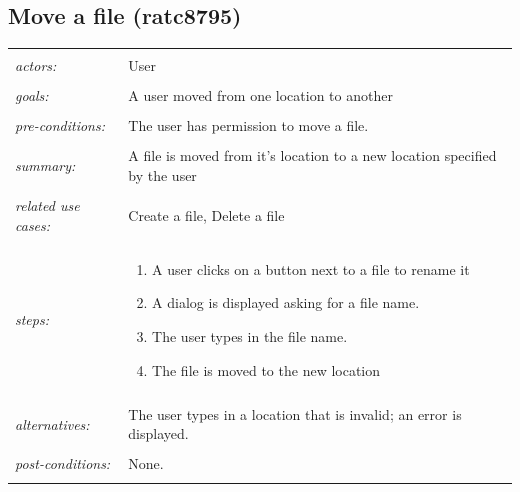 \documentclass[11pt]{report}
\begin{document}
\begin{IDE-like Features}
\begin{}
\begin{Collaborative features that would be "nice":}
\subsection{Move a file (ratc8795)}
\begin{tabular}{ p{2cm} p{12cm} }
 \hline
 \\
 \textit{actors:} & User \\ 
 \\
 \textit{goals:} & A user moved from one location to another\\
 \\
 \textit{pre-conditions:} & The user has permission to move a file. \\
 \\
 \textit{summary:} & A file is moved from it's location to a new location specified by the user \\ 
 \\
 \textit{related use cases:} & Create a file, Delete a file \\ 
 \\
 \textit{steps:} & \begin{enumerate}
  \item A user clicks on a button next to a file to rename it
  \item A dialog is displayed asking for a file name.
  \item The user types in the file name.
  \item The file is moved to the new location
 \end{enumerate} \\
 \\
 \textit{alternatives:} & The user types in a location that is invalid; an error is displayed. \\
 \\
 \textit{post-conditions:} & None. \\
 \\
\hline
\end{tabular}


\end{Collaborative features that would be "nice":}
\end{}
\end{IDE-like Features}
\end{document}
